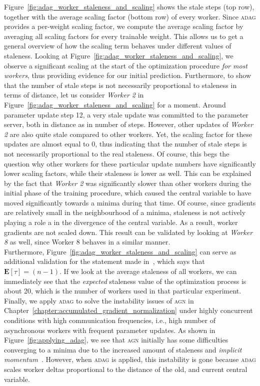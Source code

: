 \newpage
Figure~\ref{fig:adag_worker_staleness_and_scaling} shows the stale steps (top row), together with the average scaling factor (bottom row) of every worker. Since \textsc{adag} provides a per-weight scaling factor, we compute the average scaling factor by averaging all scaling factors for every trainable weight. This allows us to get a general overview of how the scaling term behaves under different values of staleness. Looking at Figure~\ref{fig:adag_worker_staleness_and_scaling}, we observe a significant scaling at the start of the optimization procedure \emph{for most workers}, thus providing evidence for our initial prediction. Furthermore, to show that the number of stale steps is not necessarily proportional to staleness in terms of distance, let us consider \emph{Worker 2} in Figure~\ref{fig:adag_worker_staleness_and_scaling} for a moment. Around parameter update step 12, a very stale update was committed to the parameter server, both in distance as in number of steps. However, other updates of \emph{Worker 2} are also quite stale compared to other workers. Yet, the scaling factor for these updates are almost equal to 0, thus indicating that the number of stale steps is not necessarily proportional to the real staleness. Of course, this begs the question why other workers for these particular update numbers have significantly lower scaling factors, while their staleness is lower as well. This can be explained by the fact that \emph{Worker 2} was significantly slower than other workers during the initial phase of the training procedure, which caused the central variable to have moved significantly towards a minima during that time. Of course, since gradients are relatively small in the neighbourhood of a minima, staleness is not actively playing a role a in the divergence of the central variable. As a result, worker gradients are not scaled down. This result can be validated by looking at \emph{Worker 8} as well, since Worker 8 behaves in a similar manner.\\

Furthermore, Figure~\ref{fig:adag_worker_staleness_and_scaling} can serve as additional validation for the statement made in~\cite{implicitmomentum}, which says that $\textbf{E}[\tau] = (n - 1)$. If we look at the average staleness of all workers, we can immediately see that the \emph{expected} staleness value of the optimization process is about 20, which is the number of workers used in that particular experiment.\\

Finally, we apply \textsc{adag} to solve the instability issues of \textsc{agn} in Chapter~\ref{chapter:accumulated_gradient_normalization} under highly concurrent conditions with high communication frequencies, i.e., high number of asynchronous workers with frequent parameter updates. As shown in Figure~\ref{fig:applying_adag}, we see that \textsc{agn} initially has some difficulties converging to a minima due to the increased amount of staleness and \emph{implicit momentum}~\cite{implicitmomentum}. However, when \textsc{adag} is applied, this instability is gone because \textsc{adag} scales worker deltas proportional to the distance of the old, and current central variable.


